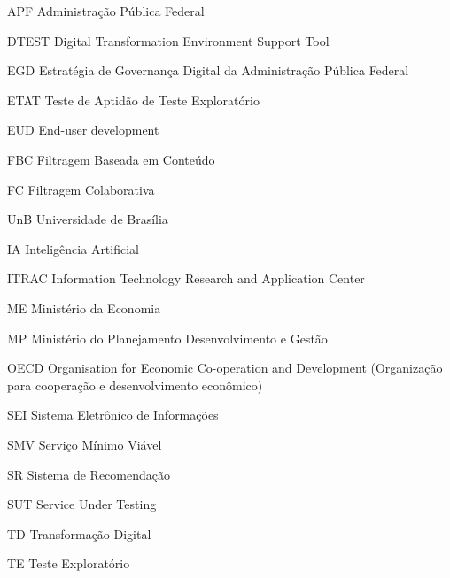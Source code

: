 \begin{siglas}

    \item[APF] Administração Pública Federal
    \item[DTEST] Digital Transformation Environment Support Tool
    \item[EGD] Estratégia de Governança Digital da Administração Pública Federal
    \item[ETAT] Teste de Aptidão de Teste Exploratório
    \item[EUD] End-user development
    \item[FBC] Filtragem Baseada em Conteúdo
    \item[FC] Filtragem Colaborativa
    \item[UnB] Universidade de Brasília
    \item[IA] Inteligência Artificial
    \item[ITRAC] Information Technology Research and Application Center
    \item[ME] Ministério da Economia
    \item[MP] Ministério do Planejamento Desenvolvimento e Gestão
    \item[OECD] Organisation for Economic Co-operation and Development (Organização
  para cooperação e desenvolvimento econômico)
    \item[SEI] Sistema Eletrônico de Informações
    \item[SMV] Serviço Mínimo Viável
    \item[SR] Sistema de Recomendação
    \item[SUT] Service Under Testing
    \item[TD]  Transformação Digital
    \item[TE] Teste Exploratório

\end{siglas}
